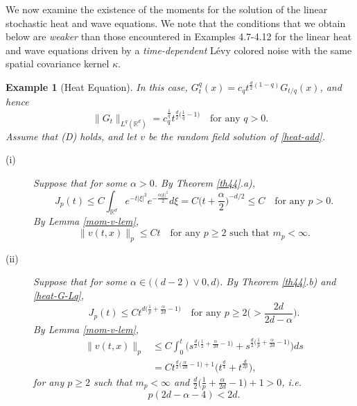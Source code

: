 \documentclass[12pt]{article}
\newtheorem{example}[theorem]{Example}
\def\bR{\mathbb{R}}
\def\k{\kappa}
\begin{document}
We now examine the existence of the moments for the solution of the linear stochastic heat and wave equations. We note that the conditions that we obtain below are {\em weaker} than those encountered in Examples 4.7-4.12 for the linear heat and wave equations driven by a {\em time-dependent} L\'evy colored noise with the same spatial covariance kernel $\k$.



\begin{example}[Heat Equation]
\label{heat-ex}
In this case, $G_t^q(x)=c_q t^{\frac{d}{2}(1-q)}G_{t/q}(x)$, and hence
\begin{equation}
\label{heat-G-Lq}
\|G_t\|_{L^q(\bR^d)}=c_q^{\frac{1}{q} }t^{\frac{d}{2}\big(\frac{1}{q}-1\big)} \quad \mbox{for any $q>0$}.
\end{equation}
Assume that (D) holds, and let $v$ be the random field solution of \eqref{heat-add}. 

\begin{description}

\item[(i)] Suppose that \fbox{$\k=H_{d,\alpha/2}$} for some $\alpha>0$. By Theorem \ref{th44}.a),
\[
J_p(t) \leq C \int_{\bR^d} e^{-t|\xi|^2}e^{-\frac{\alpha|\xi|^2}{2}}d\xi=C\Big(t+\frac{\alpha}{2}\Big)^{-d/2} \leq C \quad \mbox{for any $p>0$}.
\]
By Lemma \ref{mom-v-lem},
\[
\|v(t,x)\|_p \leq Ct \quad \mbox{for any $p\geq 2$ such that $m_p<\infty$}.
\]


\item[(ii)] Suppose that \fbox{$\k=R_{d,\alpha/2}$} for some $\alpha \in \big((d-2)\vee 0,d\big)$.  By Theorem \ref{th44}.b) and \eqref{heat-G-Lq},
\begin{equation}
\label{heat-J-R}
J_p(t) \leq C t^{d\big(\frac{1}{p}+\frac{\alpha}{2d}-1 \big)} \quad \mbox{for any $p\geq 2\big(>\frac{2d}{2d-\alpha}\big)$}.
\end{equation}
By Lemma \ref{mom-v-lem},
\begin{align}
\nonumber
\|v(t,x)\|_p & \leq C \int_0^t \Big(s^{\frac{d}{2}\big(\frac{1}{2}+\frac{\alpha}{2d}-1\big)}+s^{\frac{d}{2}\big(\frac{1}{p}+\frac{\alpha}{2d}-1\big)} \Big) ds \\
\label{heat-v-R}
&= C t^{\frac{d}{2}\big(\frac{\alpha}{2d}-1\big)+1} \big(t^{\frac{d}{4}}+t^{\frac{d}{2p}} \big),
\end{align}
for any $p\geq 2$ such that $m_p<\infty$ and $\frac{d}{2}\big(\frac{1}{p}+\frac{\alpha}{2d}-1 \big)+1>0$, i.e.
\begin{equation}
\label{p-heat-R}
p(2d-\alpha-4)<2d.
\end{equation}


\end{description}
\end{example}
\end{document}
